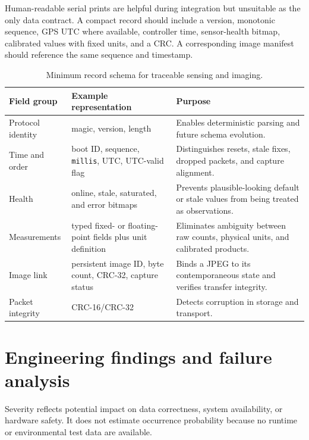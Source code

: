 \documentclass[11pt,a4paper]{article}
\newcommand{\code}[1]{\texttt{#1}}
\begin{document}
Human-readable serial prints are helpful during integration but unsuitable as the only data contract. A compact record should include a version, monotonic sequence, GPS UTC where available, controller time, sensor-health bitmap, calibrated values with fixed units, and a CRC. A corresponding image manifest should reference the same sequence and timestamp.

\begin{table}[H]
\centering
\caption{Minimum record schema for traceable sensing and imaging.}
\label{tab:schema}
\small
\begin{tabularx}{\textwidth}{P{0.25\textwidth}P{0.20\textwidth}Y}
\toprule
Field group & Example representation & Purpose\\
\midrule
Protocol identity & magic, version, length & Enables deterministic parsing and future schema evolution.\\
Time and order & boot ID, sequence, \code{millis}, UTC, UTC-valid flag & Distinguishes resets, stale fixes, dropped packets, and capture alignment.\\
Health & online, stale, saturated, and error bitmaps & Prevents plausible-looking default or stale values from being treated as observations.\\
Measurements & typed fixed- or floating-point fields plus unit definition & Eliminates ambiguity between raw counts, physical units, and calibrated products.\\
Image link & persistent image ID, byte count, CRC-32, capture status & Binds a JPEG to its contemporaneous state and verifies transfer integrity.\\
Packet integrity & CRC-16/CRC-32 & Detects corruption in storage and transport.\\
\bottomrule
\end{tabularx}
\end{table}

\section{Engineering findings and failure analysis}
\label{sec:findings}

Severity reflects potential impact on data correctness, system availability, or hardware safety. It does not estimate occurrence probability because no runtime or environmental test data are available.
\end{document}
